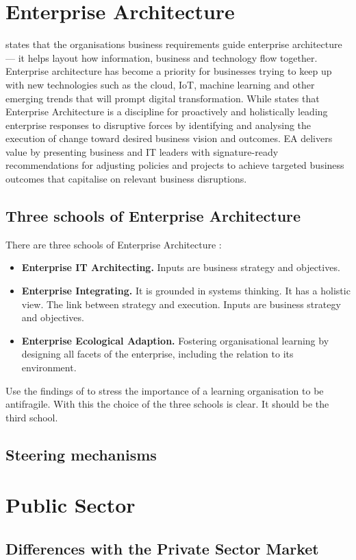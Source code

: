 \section{Enterprise Architecture}
\label{sec:tbea}

\textcite{White2018} states that the organisations business requirements guide enterprise architecture — it helps layout how information, business and technology flow together. Enterprise architecture has become a priority for businesses trying to keep up with new technologies such as the cloud, IoT, machine learning and other emerging trends that will prompt digital transformation.
While \textcite{Gartner} states that Enterprise Architecture is a discipline for proactively and holistically leading enterprise responses to disruptive forces by identifying and analysing the execution of change toward desired business vision and outcomes. EA delivers value by presenting business and IT leaders with signature-ready recommendations for adjusting policies and projects to achieve targeted business outcomes that capitalise on relevant business disruptions. 

\subsection{Three schools of Enterprise Architecture}

There are three schools of Enterprise Architecture \parencite{Lapalme2012}:
\begin{itemize}
	\item{\textbf{Enterprise IT Architecting.} Inputs are business strategy and objectives.}
	\item{\textbf{Enterprise Integrating.} It is grounded in systems thinking. It has a holistic view. The link between strategy and execution. Inputs are business strategy and objectives.}
	\item{\textbf{Enterprise Ecological Adaption.} Fostering organisational learning by designing all facets of the enterprise, including the relation to its environment.}
\end{itemize}

\begin{remark}
	Use the findings of \parencite{Botjes2020} to stress the importance of a learning organisation to be antifragile. With this the choice of the three schools is clear. It should be the third school.
\end{remark}

\subsection{Steering mechanisms}
\label{sub:tbeasteering}

\section{Public Sector}
\label{sec:tbpsmarket}

\subsection{Differences with the Private Sector Market}
\label{sub:tbdifferenceprivatesector}
